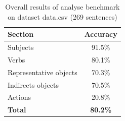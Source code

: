 \begin{table}[ht]   %
\begin{center}
    \begin{tabular}{|l|c|}
      \hline
      {\bf Section} & {\bf Accuracy} \\
      \hline
      Subjects               & 91.5\% \\
      Verbs                  & 80.1\% \\
      Representative objects & 70.3\% \\
      Indirects objects      & 70.5\% \\
      Actions                & 20.8\% \\
      \hline
      {\bf Total} & {\bf 80.2\%} \\
      \hline
    \end{tabular}
 \caption{Overall results of analyse benchmark on dataset data.csv (269 sentences)}
 \label{tab.benchmark}
\end{center}
\end{table}

